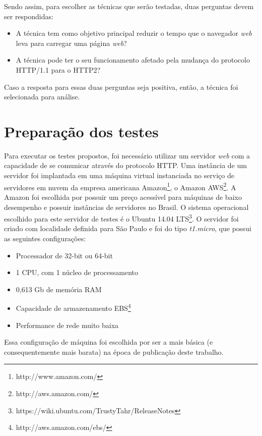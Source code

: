 Sendo assim, para escolher as técnicas que serão testadas, duas perguntas devem ser respondidas:

\begin{itemize}
	\item A técnica tem como objetivo principal reduzir o tempo que o navegador \textit{web} leva para carregar uma página \textit{web}?
	\item A técnica pode ter o seu funcionamento afetado pela mudança do protocolo HTTP/1.1 para o HTTP2?
\end{itemize}

Caso a resposta para essas duas perguntas seja positiva, então, a técnica foi selecionada para análise.

\section{Preparação dos testes}
\label{sec:preparacaodostestes}

Para executar os testes propostos, foi necessário utilizar um servidor \textit{web} com a capacidade de se comunicar através do protocolo HTTP. Uma instância de um servidor foi implantada em uma máquina virtual instanciada no serviço de servidores em nuvem da empresa americana Amazon\footnote{http://www.amazon.com/}, o Amazon AWS\footnote{http://aws.amazon.com/}. A Amazon foi escolhida por possuir um preço acessível para máquinas de baixo desempenho e possuir instâncias de servidores no Brasil. O sistema operacional escolhido para este servidor de testes é o Ubuntu 14.04 LTS\footnote{https://wiki.ubuntu.com/TrustyTahr/ReleaseNotes}. O servidor foi criado com localidade definida para São Paulo e foi do tipo \textit{t1.micro}, que possui as seguintes configurações:

\begin{itemize}
	\item Processador de 32-bit ou 64-bit
	\item 1 CPU, com 1 núcleo de processamento
	\item 0,613 Gb de memória RAM
	\item Capacidade de armazenamento EBS\footnote{http://aws.amazon.com/ebs/}
	\item Performance de rede muito baixa
\end{itemize}

Essa configuração de máquina foi escolhida por ser a mais básica (e consequentemente mais barata) na época de publicação deste trabalho.

